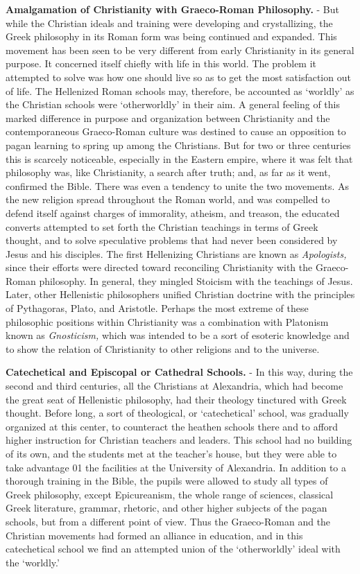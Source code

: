 \documentclass[]{book}
\begin{document}
\textbf{Amalgamation of Christianity with Graeco-Roman Philosophy.} - But while the Christian ideals and training were developing and crystallizing, the Greek philosophy in its Roman form was being continued and expanded. This movement has been seen to be very different from early Christianity in its general purpose. It concerned itself chiefly with life in this world. The problem it attempted to solve was how one should live so as to get the most satisfaction out of life. The Hellenized Roman schools may, therefore, be accounted as `worldly' as the Christian schools were `otherworldly' in their aim. A general feeling of this marked difference in purpose and organization between Christianity and the contemporaneous Graeco-Roman culture was destined to cause an opposition to pagan learning to spring up among the Christians. But for two or three centuries this is scarcely noticeable, especially in the Eastern empire, where it was felt that philosophy was, like Christianity, a search after truth; and, as far as it went, confirmed the Bible. There was even a tendency to unite the two movements. As the new religion spread throughout the Roman world, and was compelled to defend itself against charges of immorality, atheism, and treason, the educated converts attempted to set forth the Christian teachings in terms of Greek thought, and to solve speculative problems that had never been considered by Jesus and his disciples. The first Hellenizing Christians are known as \emph{Apologists,} since their efforts were directed toward reconciling Christianity with the Graeco-Roman philosophy. In general, they mingled Stoicism with the teachings of Jesus. Later, other Hellenistic philosophers unified Christian doctrine with the principles of Pythagoras, Plato, and Aristotle. Perhaps the most extreme of these philosophic positions within Christianity was a combination with Platonism known as \emph{Gnosticism,} which was intended to be a sort of esoteric knowledge and to show the relation of Christianity to other religions and to the universe.

\textbf{Catechetical and Episcopal or Cathedral Schools.} - In this way, during the second and third centuries, all the Christians at Alexandria, which had become the great seat of Hellenistic philosophy, had their theology tinctured with Greek thought. Before long, a sort of theological, or `catechetical' school, was gradually organized at this center, to counteract the heathen schools there and to afford higher instruction for Christian teachers and leaders. This school had no building of its own, and the students met at the teacher's house, but they were able to take advantage 01 the facilities at the University of Alexandria. In addition to a thorough training in the Bible, the pupils were allowed to study all types of Greek philosophy, except Epicureanism, the whole range of sciences, classical Greek literature, grammar, rhetoric, and other higher subjects of the pagan schools, but from a different point of view. Thus the Graeco-Roman and the Christian movements had formed an alliance in education, and in this catechetical school we find an attempted union of the `otherworldly' ideal with the `worldly.'
\end{document}
